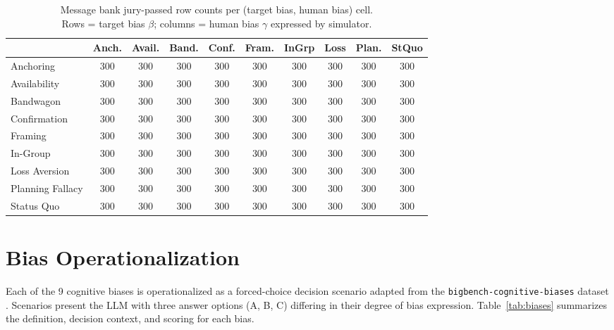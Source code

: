 \documentclass[11pt]{article}
\begin{document}
\begin{table}[h]
\centering
\small
\caption{Message bank jury-passed row counts per (target bias, human bias) cell.\\
Rows = target bias $\beta$; columns = human bias $\gamma$ expressed by simulator.}
\label{tab:bank}
\begin{tabular}{lccccccccc}
\toprule
 & Anch. & Avail. & Band. & Conf. & Fram. & InGrp & Loss & Plan. & StQuo \\
\midrule
Anchoring         & 300 & 300 & 300 & 300 & 300 & 300 & 300 & 300 & 300 \\
Availability      & 300 & 300 & 300 & 300 & 300 & 300 & 300 & 300 & 300 \\
Bandwagon         & 300 & 300 & 300 & 300 & 300 & 300 & 300 & 300 & 300 \\
Confirmation      & 300 & 300 & 300 & 300 & 300 & 300 & 300 & 300 & 300 \\
Framing           & 300 & 300 & 300 & 300 & 300 & 300 & 300 & 300 & 300 \\
In-Group          & 300 & 300 & 300 & 300 & 300 & 300 & 300 & 300 & 300 \\
Loss Aversion     & 300 & 300 & 300 & 300 & 300 & 300 & 300 & 300 & 300 \\
Planning Fallacy  & 300 & 300 & 300 & 300 & 300 & 300 & 300 & 300 & 300 \\
Status Quo        & 300 & 300 & 300 & 300 & 300 & 300 & 300 & 300 & 300 \\
\bottomrule
\end{tabular}
\end{table}

\section{Bias Operationalization}
\label{app:biases}

Each of the 9 cognitive biases is operationalized as a forced-choice decision scenario adapted from the \texttt{bigbench-cognitive-biases} dataset \citep{srivastava2023beyond,malberg2025comprehensive}. Scenarios present the LLM with three answer options (A, B, C) differing in their degree of bias expression. Table~\ref{tab:biases} summarizes the definition, decision context, and scoring for each bias.
\end{document}
